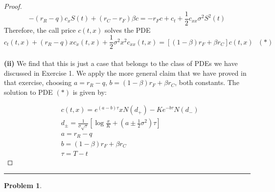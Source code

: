 \documentclass[a4paper, 10pt]{article}
\theoremstyle{definition}
\newtheorem{problem}{Problem}
\theoremstyle{hSol}
\begin{document}
\begin{proof}
\begin{equation}
  - (r_R-q)c_x S(t) + (r_C-r_F)\beta c = -r_Fc + c_t  + \frac{1}{2}c_{xx}\sigma^2 S^2(t)
\end{equation}
Therefore, the call price $c(t,x)$ solves the PDE
\begin{equation}
  c_t(t,x)  + (r_R-q)xc_x(t,x)  +\frac{1}{2}\sigma^2 x^2 c_{xx}(t,x) = [(1-\beta)r_F + \beta r_C] c(t,x)~~~(*)
\end{equation}
~\\
\textbf{(ii)} We find that this is just a case that belongs to the class of PDEs we have discussed in Exercise 1. We apply the more general claim that we have proved in that exercise, choosing $a=r_R-q$, $b=(1-\beta)r_F + \beta r_C$, both constants. The solution to PDE $(*)$ is given by:

\begin{equation}
  \begin{split}
  &c(t,x) = e^{(a-b)\tau} xN(d_+)- Ke^{-b\tau}N(d_-)\\
  &d_{\pm} = \frac{1}{\sigma \sqrt{\tau}} \left[\log \frac{x}{K}+ \left(a\pm \frac{1}{2}\sigma^2\right) \tau \right]\\
  &a=r_R-q \\
  &b=(1-\beta)r_F + \beta r_C\\
  &\tau = T-t
\end{split}
\end{equation}

\end{proof}
\newpage
\noindent\rule{16cm}{0.4pt}
\begin{problem} 
\end{problem}
\end{document}
